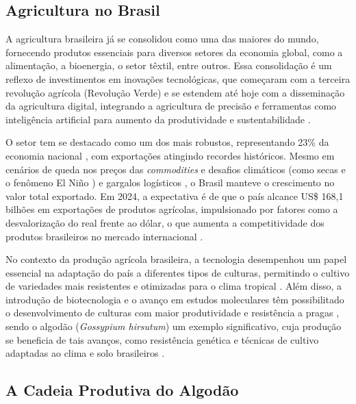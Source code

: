 
\subsection{Agricultura no Brasil}
\label{subsec:agricultura_brasil}

    A agricultura brasileira já se consolidou como uma das maiores do mundo, fornecendo produtos essenciais para diversos setores da economia global, como a alimentação, a bioenergia, o setor têxtil, entre outros. Essa consolidação é um reflexo de investimentos em inovações tecnológicas, que começaram com a terceira revolução agrícola (Revolução Verde) e se estendem até hoje com a disseminação da agricultura digital, integrando a agricultura de precisão e ferramentas como inteligência artificial para aumento da produtividade e sustentabilidade \cite{abbade2014agro, basso2024agriculture}.

    O setor tem se destacado como um dos mais robustos, representando 23\% da economia nacional \cite{filho2024pib}, com exportações atingindo recordes históricos. Mesmo em cenários de queda nos preços das \textit{commodities} e desafios climáticos (como secas e o fenômeno El Niño \cite{lin2019elnino}) e gargalos logísticos \cite{goncalves2024logistica}, o Brasil manteve o crescimento no valor total exportado. Em 2024, a expectativa é de que o país alcance US\$ 168,1 bilhões em exportações de produtos agrícolas, impulsionado por fatores como a desvalorização do real frente ao dólar, o que aumenta a competitividade dos produtos brasileiros no mercado internacional \cite{cardoso2024perspectivas}.

    No contexto da produção agrícola brasileira, a tecnologia desempenhou um papel essencial na adaptação do país a diferentes tipos de culturas, permitindo o cultivo de variedades mais resistentes e otimizadas para o clima tropical \cite{basso2024agriculture}. Além disso, a introdução de biotecnologia e o avanço em estudos moleculares têm possibilitado o desenvolvimento de culturas com maior produtividade e resistência a pragas \cite{das2023biotech}, sendo o algodão (\textit{Gossypium hirsutum}) um exemplo significativo, cuja produção se beneficia de tais avanços, como resistência genética e técnicas de cultivo adaptadas ao clima e solo brasileiros \cite{ribeiro2017cottontrans, ribeiro2019cottontrans, ribeiro2023cottontrans}.

\subsection{A Cadeia Produtiva do Algodão}
\label{subsec:cadeia_algodao}


